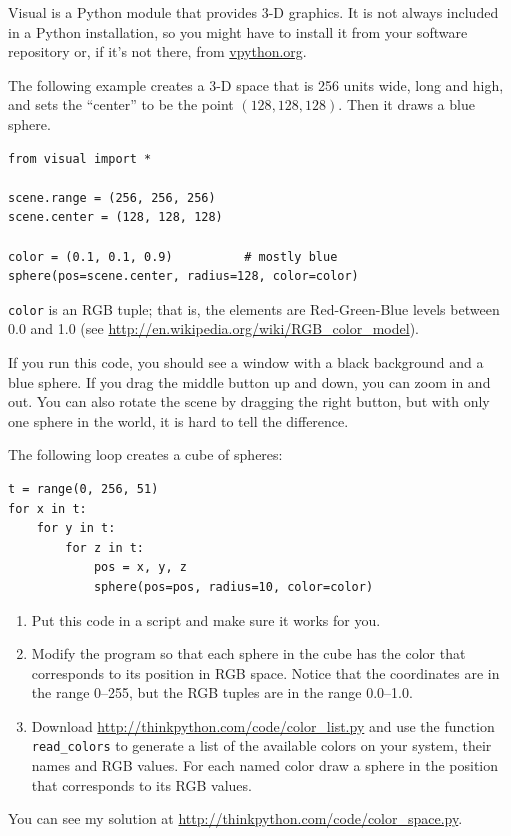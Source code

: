 \documentclass[10pt]{book}
\begin{document}
\begin{exercise}

Visual is a Python module that provides 3-D graphics.  It is
not always included in a Python installation, so you might have
to install it from your software repository or, if it's not there,
from \url{vpython.org}.

The following example creates a 3-D space that is 256 units
wide, long and high, and sets the ``center'' to be the
point $(128,128,128)$.  Then it draws a blue sphere.

\begin{verbatim}
from visual import *

scene.range = (256, 256, 256)
scene.center = (128, 128, 128)

color = (0.1, 0.1, 0.9)          # mostly blue
sphere(pos=scene.center, radius=128, color=color)
\end{verbatim}

{\tt color} is an RGB tuple; that is, the elements are Red-Green-Blue
levels between 0.0 and 1.0 (see
\url{http://en.wikipedia.org/wiki/RGB_color_model}).

If you run this code, you should see a window with a black
background and a blue sphere.  If you drag the middle button
up and down, you can zoom in and out.  You can also rotate
the scene by dragging the right button, but with only one
sphere in the world, it is hard to tell the difference.

The following loop creates a cube of spheres:

\begin{verbatim}
t = range(0, 256, 51)
for x in t:
    for y in t:
        for z in t:
            pos = x, y, z
            sphere(pos=pos, radius=10, color=color)
\end{verbatim}

\begin{enumerate}

\item Put this code in a script and make sure it works for
you.

\item Modify the program so that each sphere in the cube
has the color that corresponds to its position in RGB space.
Notice that the coordinates are in the range 0--255, but
the RGB tuples are in the range 0.0--1.0.

\item Download \url{http://thinkpython.com/code/color_list.py}
and use the function \verb"read_colors" to generate a list
of the available colors on your system, their names and
RGB values.  For each named color draw a sphere in the
position that corresponds to its RGB values.



\end{enumerate}

You can see my solution at \url{http://thinkpython.com/code/color_space.py}.

\end{exercise}
\end{document}
